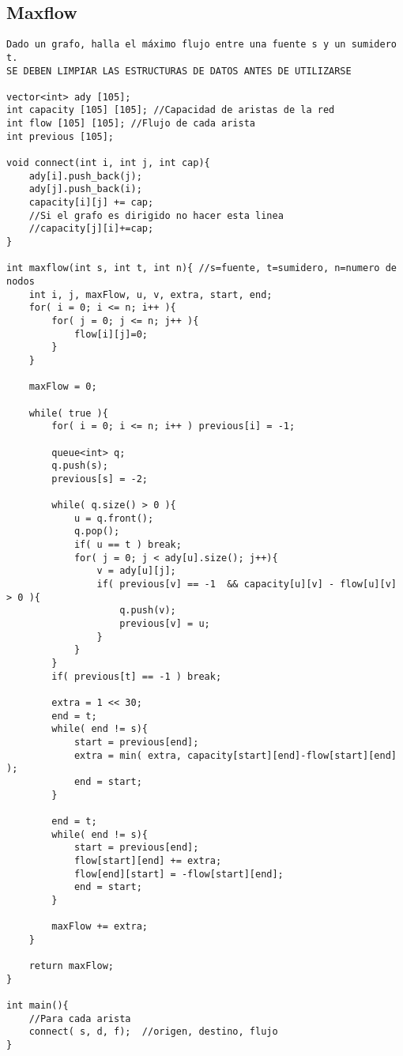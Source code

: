\documentclass[10pt,letterpaper,twocolumn,twosided]{article}
\begin{document}
\subsection{Maxflow}
\begin{lstlisting}
Dado un grafo, halla el máximo flujo entre una fuente s y un sumidero t.
SE DEBEN LIMPIAR LAS ESTRUCTURAS DE DATOS ANTES DE UTILIZARSE

vector<int> ady [105]; 
int capacity [105] [105]; //Capacidad de aristas de la red
int flow [105] [105]; //Flujo de cada arista
int previous [105];

void connect(int i, int j, int cap){
    ady[i].push_back(j);
    ady[j].push_back(i);
    capacity[i][j] += cap;
    //Si el grafo es dirigido no hacer esta linea
    //capacity[j][i]+=cap;
}

int maxflow(int s, int t, int n){ //s=fuente, t=sumidero, n=numero de nodos
    int i, j, maxFlow, u, v, extra, start, end;
    for( i = 0; i <= n; i++ ){
        for( j = 0; j <= n; j++ ){
            flow[i][j]=0;
        }
    }

    maxFlow = 0;

    while( true ){
        for( i = 0; i <= n; i++ ) previous[i] = -1;

        queue<int> q;
        q.push(s);
        previous[s] = -2;

        while( q.size() > 0 ){
            u = q.front();
            q.pop();
            if( u == t ) break;
            for( j = 0; j < ady[u].size(); j++){
                v = ady[u][j];
                if( previous[v] == -1  && capacity[u][v] - flow[u][v] > 0 ){
                    q.push(v);
                    previous[v] = u;
                }
            }
        }
        if( previous[t] == -1 ) break;

        extra = 1 << 30;
        end = t;
        while( end != s){
            start = previous[end];
            extra = min( extra, capacity[start][end]-flow[start][end] );
            end = start;
        }

        end = t;
        while( end != s){
            start = previous[end];
            flow[start][end] += extra;
            flow[end][start] = -flow[start][end];
            end = start;
        }

        maxFlow += extra;
    }

    return maxFlow;
}

int main(){
    //Para cada arista
    connect( s, d, f);  //origen, destino, flujo
}

\end{lstlisting}
\end{document}
